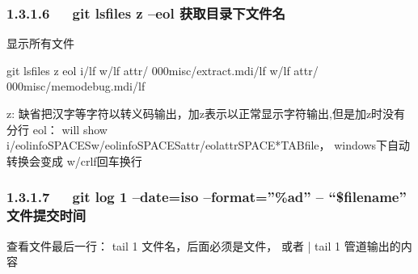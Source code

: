 \documentclass[letterpaper,12pt,english]{sphinxmanual}
\begin{document}
\subsubsection{1.3.1.6   git ls\sphinxhyphen{}files \sphinxhyphen{}z –eol 获取目录下文件名}
\label{\detokenize{001software/001install/001._u7f51_u7ad9/github:git-ls-files-z-eol}}
显示所有文件


\begin{sphinxVerbatim}[commandchars=\\\{\}]
\PYGZdl{} git ls\PYGZhy{}files \PYGZhy{}z \PYGZhy{}\PYGZhy{}eol
i/lf    w/lf    attr/                   000misc/extract.mdi/lf    w/lf    attr/                   000misc/memo\PYGZhy{}debug.mdi/lf

\PYGZhy{}z: 缺省把汉字等字符以\PYGZbs{}转义码输出，加z表示以正常显示字符输出,但是加z时没有分行
\PYGZhy{}\PYGZhy{}eol： will show i/\PYGZlt{}eolinfo\PYGZgt{}\PYGZlt{}SPACES\PYGZgt{}w/\PYGZlt{}eolinfo\PYGZgt{}\PYGZlt{}SPACES\PYGZgt{}attr/\PYGZlt{}eolattr\PYGZgt{}\PYGZlt{}SPACE*\PYGZgt{}\PYGZlt{}TAB\PYGZgt{}\PYGZlt{}file\PYGZgt{}， windows下自动转换会变成 w/crlf回车换行
\end{sphinxVerbatim}


\subsubsection{1.3.1.7   git log \sphinxhyphen{}1 –date=iso –format=”\%ad” – “\$filename” 文件提交时间}
\label{\detokenize{001software/001install/001._u7f51_u7ad9/github:git-log-1-date-iso-format-ad-filename}}

查看文件最后一行： tail \sphinxhyphen{}1 文件名，后面必须是文件， 或者 | tail \sphinxhyphen{}1 管道输出的内容
\end{document}

